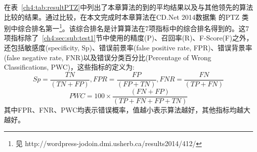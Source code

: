  在表~\ref{ch4:tab:resultPTZ}中列出了本章算法的到的平均结果以及与其他领先的算法比较的结果。通过比较，在本文完成时本章算法在CD.Net 2014数据集\cite{CD2014} 的PTZ 类别中综合排名第一\footnote{见 http://wordpress-jodoin.dmi.usherb.ca/results2014/412/}。该综合排名是计算算法在7项指标中的综合排名得到的。这7项指标除了~\ref{ch4:sec:sub:test1}节中使用的精度(P)、召回率(R)、F-Score(F)之外，还包括敏感度(specificity, Sp)、错误前景率(false positive rate, FPR)、错误背景率(false negative rate, FNR)以及错误分类百分比(Percentage of Wrong Classifications, PWC)，这些指标的定义为:
 $$ Sp = \frac{TN}{(TN + FP)},FPR = \frac{FP}{(FP+TN)}, FNR = \frac{FN}{(TP+FN)} $$
 $$ PWC = 100 \times \frac{(FN+FP)}{(TP+FN+FP+TN)} $$
 其中FPR、FNR、PWC均表示错误概率，值越小表示算法越好，其他指标均越大越好。
 \begin{table}[ht]
\caption{CD.Net 2014数据集\cite{CD2014}中的PTZ分类视频处理结果比较}
\label{ch4:tab:resultPTZ}
\end{table}

